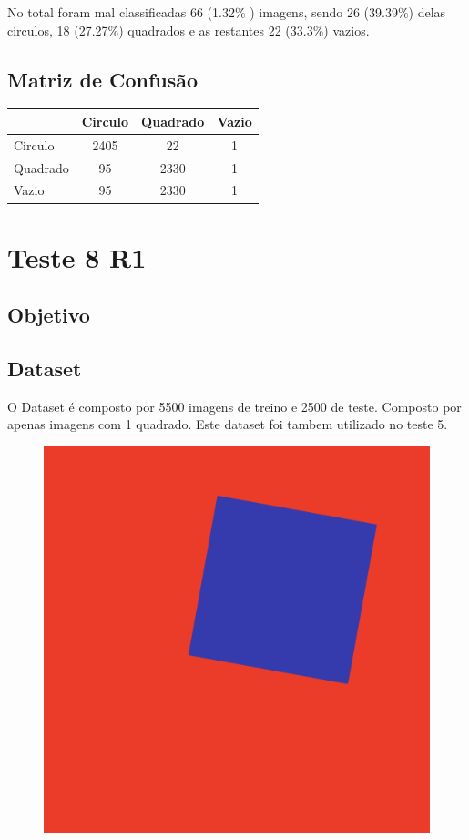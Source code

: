 No total foram mal classificadas 66 (1.32\% ) imagens, sendo 26 (39.39\%) delas circulos, 18 (27.27\%) quadrados e as restantes 22 (33.3\%) vazios. 

\subsection{Matriz de Confusão}

\begin{table}[H]
\centering
\begin{tabular}{l|c c c}
                 & Circulo & Quadrado & Vazio \\
\hline
Circulo          & 2405         & 22     & 1           \\
Quadrado         & 95           & 2330   & 1           \\
Vazio            & 95           & 2330   & 1           \\
\end{tabular}
\end{table}


\section{Teste 8 R1}
\subsection{Objetivo}

\subsection{Dataset}
O Dataset é composto por 5500 imagens de treino e 2500 de teste. Composto por apenas imagens com 1 quadrado. 
Este dataset foi tambem utilizado no teste 5.
    \begin{figure}[H]
        \centering
        \includegraphics[width=0.25\linewidth]{imgs/Test_8/dataset/square_22.png}
        \label{fig:enter-label}
    \end{figure}
